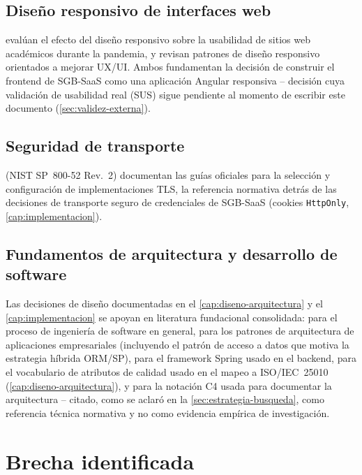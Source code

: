 \subsection{Diseño responsivo de interfaces web}

\citet{parlakkilic2022responsive} evalúan el efecto del diseño
responsivo sobre la usabilidad de sitios web académicos durante la
pandemia, y \citet{aienobe2025responsive} revisan patrones de diseño
responsivo orientados a mejorar UX/UI. Ambos fundamentan la decisión de
construir el frontend de SGB-SaaS como una aplicación Angular
responsiva -- decisión cuya validación de usabilidad real (SUS) sigue
pendiente al momento de escribir este documento
(\autoref{sec:validez-externa}).

\subsection{Seguridad de transporte}

\citet{mckay2019tls} (NIST SP~800-52 Rev.~2) documentan las guías
oficiales para la selección y configuración de implementaciones TLS, la
referencia normativa detrás de las decisiones de transporte seguro de
credenciales de SGB-SaaS (cookies \texttt{HttpOnly}, \autoref{cap:implementacion}).

\subsection{Fundamentos de arquitectura y desarrollo de software}

Las decisiones de diseño documentadas en el \autoref{cap:diseno-arquitectura}
y el \autoref{cap:implementacion} se apoyan en literatura fundacional
consolidada: \citet{sommerville2011se} para el proceso de ingeniería de
software en general, \citet{fowler2002poeaa} para los patrones de
arquitectura de aplicaciones empresariales (incluyendo el patrón de
acceso a datos que motiva la estrategia híbrida ORM/SP),
\citet{walls2022springinaction} para el framework Spring usado en el
backend, \citet{bass2021softwarearch} para el vocabulario de atributos
de calidad usado en el mapeo a ISO/IEC~25010
(\autoref{cap:diseno-arquitectura}), y \citet{brown2023c4model} para la
notación C4 usada para documentar la arquitectura -- citado, como se
aclaró en la \autoref{sec:estrategia-busqueda}, como referencia técnica
normativa y no como evidencia empírica de investigación.

\section{Brecha identificada}

